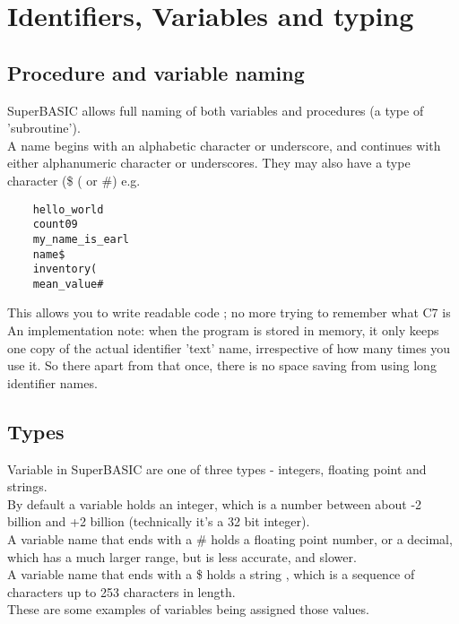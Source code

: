 \chapter{Identifiers, Variables and typing}

\section{Procedure and variable naming}

SuperBASIC allows full naming of both variables and procedures (a type of 'subroutine').\\
A name begins with an alphabetic character or underscore, and continues with either alphanumeric character or underscores. They may also have a type character (\$ ( or \#) e.g.

\begin{verbatim}
	hello_world
	count09
	my_name_is_earl
	name$
	inventory(
	mean_value#
\end{verbatim}

This allows you to write readable code ; no more trying to remember what C7 is\\

An implementation note: when the program is stored in memory, it only keeps one copy of the actual identifier 'text' name, irrespective of how many times you use it. So there apart from that once, there is no space saving from using long identifier names.

\section{Types}

Variable in SuperBASIC are one of three types - integers, floating point and strings.\\

By default a variable holds an integer, which is a number between about -2 billion and +2 billion (technically it's a 32 bit integer).\\

A variable name that ends with a \# holds a floating point number, or a decimal, which has a much larger range, but is less accurate, and slower.\\

A variable name that ends with a \$ holds a string , which is a sequence of characters up to 253 characters in length.\\

These are some examples of variables being assigned those values.


